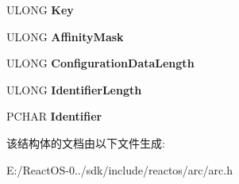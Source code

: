 \begin{DoxyCompactItemize}
U\+L\+O\+NG {\bfseries Key}
\item 
\mbox{\label{struct___c_o_n_f_i_g_u_r_a_t_i_o_n___c_o_m_p_o_n_e_n_t_a76329b7ce42f834c0cf4493890c96f41}} 
U\+L\+O\+NG {\bfseries Affinity\+Mask}
\item 
\mbox{\label{struct___c_o_n_f_i_g_u_r_a_t_i_o_n___c_o_m_p_o_n_e_n_t_a586ce45f3dd11e0d708c02885eb90eb8}} 
U\+L\+O\+NG {\bfseries Configuration\+Data\+Length}
\item 
\mbox{\label{struct___c_o_n_f_i_g_u_r_a_t_i_o_n___c_o_m_p_o_n_e_n_t_a72d562439bbbc7535db724094c8ad193}} 
U\+L\+O\+NG {\bfseries Identifier\+Length}
\item 
\mbox{\label{struct___c_o_n_f_i_g_u_r_a_t_i_o_n___c_o_m_p_o_n_e_n_t_a19166e8672b66e0cd48b95cfc53ff0e8}} 
P\+C\+H\+AR {\bfseries Identifier}
\end{DoxyCompactItemize}


该结构体的文档由以下文件生成\+:\begin{DoxyCompactItemize}
\item 
E\+:/\+React\+O\+S-\/0../sdk/include/reactos/arc/arc.\+h\end{DoxyCompactItemize}

